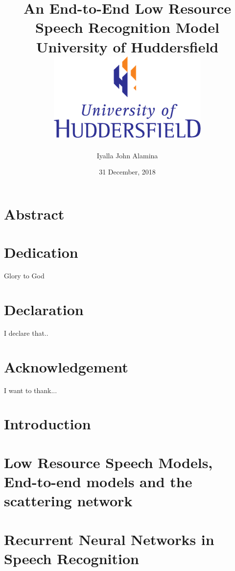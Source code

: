 \documentclass[12pt,twoside]{report}
\title{
    {An End-to-End Low Resource Speech Recognition Model}\\
    {\large University of Huddersfield}\\
    {\includegraphics{university.png}}
}
\author{Iyalla John Alamina}
\date{31 December, 2018}
\begin{document}
\maketitle
{}

\chapter*{Abstract}

\chapter*{Dedication}
Glory to God

\chapter*{Declaration}
I declare that..

\chapter*{Acknowledgement}
I want to thank...

\tableofcontents

\chapter{Introduction}


\chapter{Low Resource Speech Models, End-to-end models and the scattering network}


\chapter{Recurrent Neural Networks in Speech Recognition}





\end{document}
